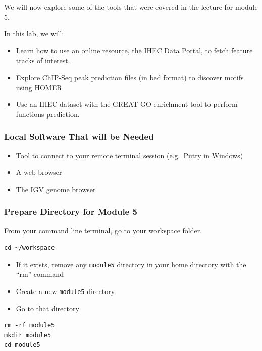 \documentclass[
]{book}
\providecommand{\tightlist}{%
  \setlength{\itemsep}{0pt}\setlength{\parskip}{0pt}}
\begin{document}
We will now explore some of the tools that were covered in the lecture for module 5.

In this lab, we will:

\begin{itemize}
\tightlist
\item
  Learn how to use an online resource, the IHEC Data Portal, to fetch feature tracks of interest.
\item
  Explore ChIP-Seq peak prediction files (in bed format) to discover motifs using HOMER.
\item
  Use an IHEC dataset with the GREAT GO enrichment tool to perform functions prediction.
\end{itemize}

\subsubsection{Local Software That will be Needed}\label{local-software-that-will-be-needed}

\begin{itemize}
\tightlist
\item
  Tool to connect to your remote terminal session (e.g.~Putty in Windows)
\item
  A web browser
\item
  The IGV genome browser
\end{itemize}

\subsubsection{Prepare Directory for Module 5}\label{prepare-directory-for-module-5}

From your command line terminal, go to your workspace folder.

\begin{verbatim}
cd ~/workspace
\end{verbatim}

\begin{itemize}
\tightlist
\item
  If it exists, remove any \texttt{module5} directory in your home directory with the ``rm'' command
\item
  Create a new \texttt{module5} directory
\item
  Go to that directory
\end{itemize}

\begin{verbatim}
rm -rf module5
mkdir module5
cd module5
\end{verbatim}
\end{document}
